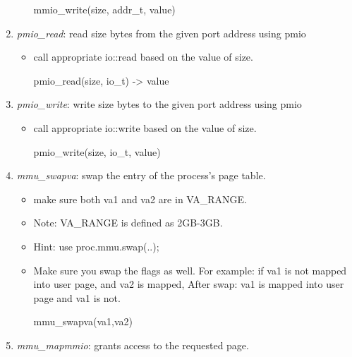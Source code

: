 \documentclass[]{book}
\newenvironment{Shaded}{}{}
\newcommand{\NormalTok}[1]{{#1}}
\begin{document}
\begin{enumerate}
\begin{itemize}
\begin{Shaded}
\begin{Highlighting}[]
\NormalTok{mmio_write(size, addr_t, value)}
\end{Highlighting}
\end{Shaded}
  \end{itemize}
\item
  \emph{pmio\_read}: read size bytes from the given port address using
  pmio

  \begin{itemize}
  \item
    call appropriate io::read based on the value of size.

\begin{Shaded}
\begin{Highlighting}[]
\NormalTok{pmio_read(size, io_t) -> value}
\end{Highlighting}
\end{Shaded}
  \end{itemize}
\item
  \emph{pmio\_write}: write size bytes to the given port address using
  pmio

  \begin{itemize}
  \item
    call appropriate io::write based on the value of size.

\begin{Shaded}
\begin{Highlighting}[]
\NormalTok{pmio_write(size, io_t, value)}
\end{Highlighting}
\end{Shaded}
  \end{itemize}
\item
  \emph{mmu\_swapva}: swap the entry of the process's page table.

  \begin{itemize}
  \item
    make sure both va1 and va2 are in VA\_RANGE.
  \item
    Note: VA\_RANGE is defined as 2GB-3GB.
  \item
    Hint: use proc.mmu.swap(..);
  \item
    Make sure you swap the flags as well. For example: if va1 is not
    mapped into user page, and va2 is mapped, After swap: va1 is mapped
    into user page and va1 is not.

\begin{Shaded}
\begin{Highlighting}[]
\NormalTok{mmu_swapva(va1,va2)}
\end{Highlighting}
\end{Shaded}
  \end{itemize}
\item
  \emph{mmu\_mapmmio}: grants access to the requested page.


\end{enumerate}
\end{document}

